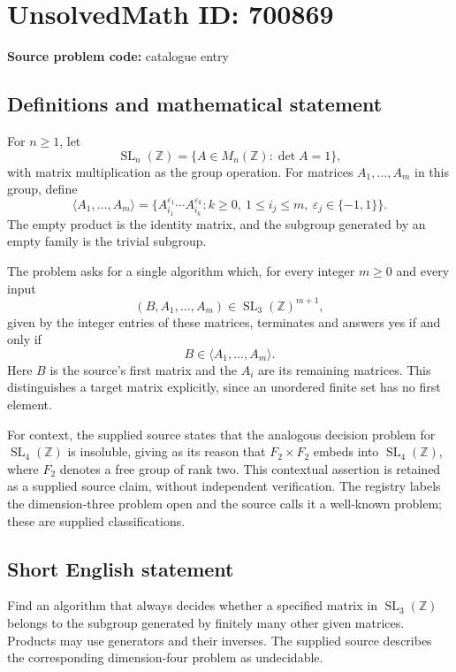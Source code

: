\documentclass[11pt]{article}
\newcommand{\Z}{\mathbb{Z}}
\begin{document}
\section*{UnsolvedMath ID: 700869}
\textbf{Source problem code:} catalogue entry
\subsection{Definitions and mathematical statement}
For \(n\geq 1\), let
\[
\operatorname{SL}_n(\Z)=\{A\in M_n(\Z):\det A=1\},
\]
with matrix multiplication as the group operation. For matrices \(A_1,\ldots,A_m\) in this group, define
\[
\langle A_1,\ldots,A_m\rangle
=\{A_{i_1}^{\varepsilon_1}\cdots A_{i_k}^{\varepsilon_k}: k\geq 0,\ 1\leq i_j\leq m,\ \varepsilon_j\in\{-1,1\}\}.
\]
The empty product is the identity matrix, and the subgroup generated by an empty family is the trivial subgroup.

The problem asks for a single algorithm which, for every integer \(m\geq 0\) and every input
\[
(B,A_1,\ldots,A_m)\in\operatorname{SL}_3(\Z)^{m+1},
\]
given by the integer entries of these matrices, terminates and answers yes if and only if
\[
B\in\langle A_1,\ldots,A_m\rangle.
\]
Here \(B\) is the source's first matrix and the \(A_i\) are its remaining matrices. This distinguishes a target matrix explicitly, since an unordered finite set has no first element.

For context, the supplied source states that the analogous decision problem for \(\operatorname{SL}_4(\Z)\) is insoluble, giving as its reason that \(F_2\times F_2\) embeds into \(\operatorname{SL}_4(\Z)\), where \(F_2\) denotes a free group of rank two. This contextual assertion is retained as a supplied source claim, without independent verification. The registry labels the dimension-three problem open and the source calls it a well-known problem; these are supplied classifications.
\subsection{Short English statement}
Find an algorithm that always decides whether a specified matrix in \(\operatorname{SL}_3(\Z)\) belongs to the subgroup generated by finitely many other given matrices. Products may use generators and their inverses. The supplied source describes the corresponding dimension-four problem as undecidable.
\end{document}
